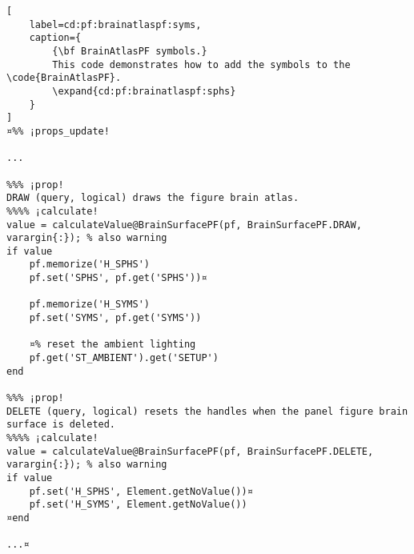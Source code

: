 \documentclass{tufte-handout}
\begin{document}
\begin{lstlisting}[
	label=cd:pf:brainatlaspf:syms,
	caption={
		{\bf BrainAtlasPF symbols.}
		This code demonstrates how to add the symbols to the \code{BrainAtlasPF}.
		\expand{cd:pf:brainatlaspf:sphs}
	}
]
¤%% ¡props_update!

...
    
%%% ¡prop!
DRAW (query, logical) draws the figure brain atlas.
%%%% ¡calculate!
value = calculateValue@BrainSurfacePF(pf, BrainSurfacePF.DRAW, varargin{:}); % also warning
if value
    pf.memorize('H_SPHS')
    pf.set('SPHS', pf.get('SPHS'))¤
    
    pf.memorize('H_SYMS')
    pf.set('SYMS', pf.get('SYMS'))

    ¤% reset the ambient lighting
    pf.get('ST_AMBIENT').get('SETUP')
end

%%% ¡prop!
DELETE (query, logical) resets the handles when the panel figure brain surface is deleted.
%%%% ¡calculate!
value = calculateValue@BrainSurfacePF(pf, BrainSurfacePF.DELETE, varargin{:}); % also warning
if value
    pf.set('H_SPHS', Element.getNoValue())¤
    pf.set('H_SYMS', Element.getNoValue())
¤end

...¤
\end{lstlisting}
\end{document}
